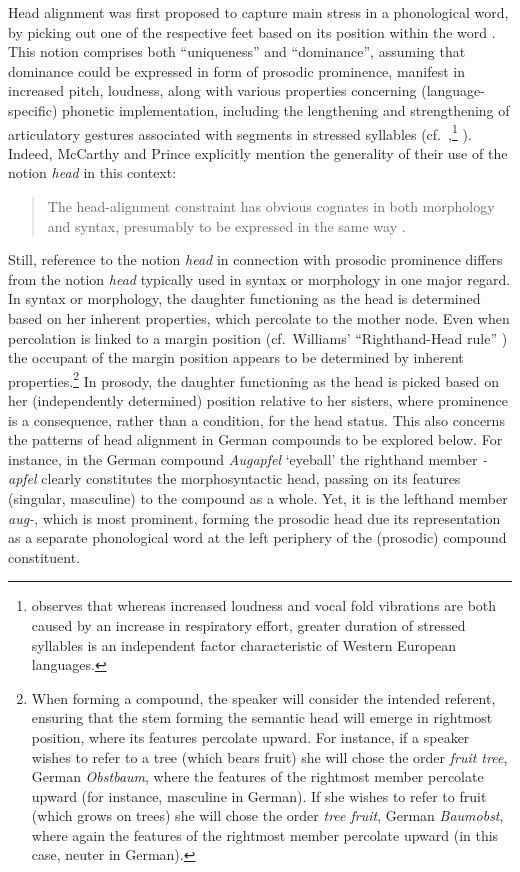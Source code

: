 \documentclass[output=paper
 ,nobabel
 ,draftmode
 ,colorlinks, citecolor=brown
]{langscibook}
\begin{document}
Head alignment was first proposed to capture main stress in a phonological word, by picking out one of the respective feet based on its position within the word \citep[98]{McCarthyPrince1993}. This notion comprises both ``uniqueness'' and ``dominance'', assuming that dominance could be expressed in form of prosodic prominence, manifest in increased pitch, loudness, along with various properties concerning (language-specific) phonetic implementation, including the lengthening and strengthening of articulatory gestures associated with segments in stressed syllables (cf.\ \citealp[125]{Lehiste1970},\footnote{\citet*[125]{Lehiste1970} observes that whereas increased loudness and vocal fold vibrations are both caused by an increase in respiratory effort, greater duration of stressed syllables is an independent factor characteristic of Western European 
languages.} \citealp[90]{Ladefoged2003}). Indeed, McCarthy and Prince explicitly mention the generality of their use of the  notion \emph{head} in this context:

\begin{quote}
    The head-alignment constraint has obvious cognates in both morphology and syntax, presumably to be expressed in the same way \citep[99]{McCarthyPrince1993}.
\end{quote}

\largerpage[-1]
\noindent
Still, reference to the notion \emph{head} in connection with  prosodic prominence differs from the
notion \emph{head} typically used in syntax or morphology in one major regard. In syntax or
morphology, the daughter functioning as the head is determined based on her inherent properties,
which percolate to the mother node. Even when percolation is linked to a margin position (cf.\
Williams' ``Righthand-Head rule'' \citealp[248]{Williams1981}) the occupant of the margin position
appears to be determined by inherent properties.\footnote{When forming a compound, the speaker will
  consider the intended referent, ensuring that the stem forming the semantic head will emerge in
  rightmost position, where its features percolate upward. For instance, if a speaker wishes to
  refer to a tree (which bears fruit) she will chose the order \emph{fruit tree}, German
  \emph{Obstbaum}, where the features of the rightmost member percolate upward (for instance,
  masculine in German). If she wishes to refer to fruit (which grows on trees) she will chose the
  order \emph{tree fruit}, German \emph{Baumobst}, where again the features of the rightmost member
  percolate upward (in this case, neuter in German).} In prosody, the daughter functioning as the
head is picked based on her (independently determined) position relative to her sisters, where
prominence is a consequence, rather than a condition, for the head status. This also concerns the
patterns of head alignment in German compounds to be explored below. For instance, in the German
compound \emph{Augapfel} `eyeball' the righthand member \emph{-apfel} clearly constitutes the
morphosyntactic head, passing on its features (singular, masculine) to the compound as a whole. Yet,
it is the lefthand member \emph{aug-}, which is most prominent, forming the prosodic head due its
representation as a separate phonological word at the left periphery of the (prosodic) compound
constituent. 
\end{document}
